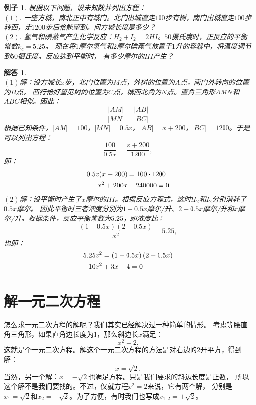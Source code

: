 \documentclass[12pt,UTF8]{ctexbook}
\newtheorem{ex}{例子}[section]
\newtheorem*{so}{解答}
\begin{document}
\begin{ex}\label{ex:4-0-0}
    根据以下问题，设未知数并列出方程：\\
    $(1).$ 一座方城，南北正中有城门。北门出城直走$100$步有树，南门出城直走$100$步转西，走$1200$步后恰能望到。问方城长度是多少？\\
    $(2).$ 氢气和碘蒸气产生化学反应：$H_2 + I_2 = 2HI$。$50$摄氏度时，正反应的平衡常数$k_c=5.25$。
    现在将$1$摩尔氢气和$2$摩尔碘蒸气放置于$1$升的容器中，将温度调节到$50$摄氏度。反应达到平衡时，
    有多少摩尔的$HI$产生？
\end{ex}
\begin{so}
    \mbox{} \\
    $(1)$解：设方城长$x$步，北门位置为$M$点，外树的位置为$A$点，南门外转向的位置为$B$点，
    西行恰好望见树的位置为$C$点，城西北角为$N$点。直角三角形$AMN$和$ABC$相似。因此：
    $$ \frac{|AM|}{|MN|} = \frac{|AB|}{|BC|} $$
    根据已知条件，$|AM| = 100$，$|MN| = 0.5x$，$|AB| = x + 200$，$|BC| = 1200$。于是可以列出方程：
    $$ \frac{100}{0.5x} = \frac{x + 200}{1200}, $$
    即：
    \begin{align}
        0.5x(x + 200) &= 100 \cdot 1200 \notag \\
        x^2 + 200x &- 240000 = 0  \notag
    \end{align} 
    $(2)$解：设平衡时产生了$x$摩尔的$HI$。根据反应方程式，这时$H_2$和$I_2$分别消耗了$0.5x$摩尔。
    因此平衡时三者浓度分别为$1 - 0.5x$摩尔/升、$2 - 0.5x$摩尔/升和$x$摩尔/升。根据条件，反应平衡常数为$5.25$，即浓度比：
    $$ \frac{(1 - 0.5x)(2 - 0.5x)}{x^2} = 5.25,$$
    也即：
    \begin{align}
        5.25 x^2 &= \left(1 - 0.5x\right)\left(2 - 0.5x\right) \notag \\
        10 x^2 &+ 3x - 4 = 0 \notag
    \end{align} 
\end{so}

\section{解一元二次方程}
怎么求一元二次方程的解呢？我们其实已经解决过一种简单的情形。
考虑等腰直角三角形，如果直角边长度为$1$，那么斜边长$x$满足：
$$x^2 = 2.$$
这就是个一元二次方程。解这个一元二次方程的方法是对右边的$2$开平方，得到解：
$$ x = \sqrt{2}.$$
当然，另一个解：$x = -\sqrt{2}$也满足方程。只是我们要求的斜边长度是正数，
所以这个解不是我们要找的。不过，仅就方程$ x^2 = 2$来说，它有两个解，
分别是$x_1 = \sqrt{2}$和$x_2 = -\sqrt{2}$。为了方便，有时我们也写成$x_{1,2} = \pm\sqrt{2}$。
\end{document}
